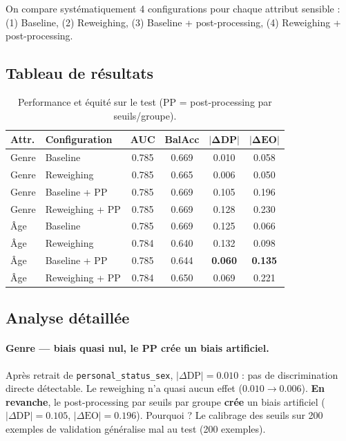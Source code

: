 \documentclass[11pt, a4paper]{article}
\begin{document}
\begin{questionbox}
On compare syst\'{e}matiquement 4 configurations pour chaque attribut sensible : (1) Baseline, (2) Reweighing, (3) Baseline + post-processing, (4) Reweighing + post-processing.
\end{questionbox}

\subsection{Tableau de r\'{e}sultats}

\begin{table}[H]
\centering
\small
\begin{tabular}{llcccc}
\toprule
\textbf{Attr.} & \textbf{Configuration} & \textbf{AUC} & \textbf{BalAcc} & $\boldsymbol{|\Delta\textbf{DP}|}$ & $\boldsymbol{|\Delta\textbf{EO}|}$ \\
\midrule
\rowcolor{accent!5}
Genre & Baseline          & 0.785 & 0.669 & 0.010 & 0.058 \\
\rowcolor{accent!5}
Genre & Reweighing        & 0.785 & 0.665 & 0.006 & 0.050 \\
\rowcolor{accent!10}
Genre & Baseline + PP     & 0.785 & 0.669 & 0.105 & 0.196 \\
\rowcolor{accent!10}
Genre & Reweighing + PP   & 0.785 & 0.669 & 0.128 & 0.230 \\
\midrule
\rowcolor{fair!5}
\^{A}ge  & Baseline          & 0.785 & 0.669 & 0.125 & 0.066 \\
\rowcolor{fair!5}
\^{A}ge  & Reweighing        & 0.784 & 0.640 & 0.132 & 0.098 \\
\rowcolor{fair!10}
\^{A}ge  & Baseline + PP     & 0.785 & 0.644 & \textbf{0.060} & \textbf{0.135} \\
\rowcolor{fair!10}
\^{A}ge  & Reweighing + PP   & 0.784 & 0.650 & 0.069 & 0.221 \\
\bottomrule
\end{tabular}
\caption{Performance et \'{e}quit\'{e} sur le test (PP = post-processing par seuils/groupe).}
\label{tab:comparison}
\end{table}

\subsection{Analyse d\'{e}taill\'{e}e}

\paragraph{Genre --- biais quasi nul, le PP cr\'{e}e un biais artificiel.}
Apr\`{e}s retrait de \texttt{personal\_status\_sex}, $|\Delta\text{DP}| = 0.010$ : pas de discrimination directe d\'{e}tectable. Le reweighing n'a quasi aucun effet ($0.010 \to 0.006$). \textbf{En revanche}, le post-processing par seuils par groupe \textbf{cr\'{e}e} un biais artificiel ($|\Delta\text{DP}| = 0.105$, $|\Delta\text{EO}| = 0.196$). Pourquoi ? Le calibrage des seuils sur 200 exemples de validation g\'{e}n\'{e}ralise mal au test (200 exemples).
\end{document}
